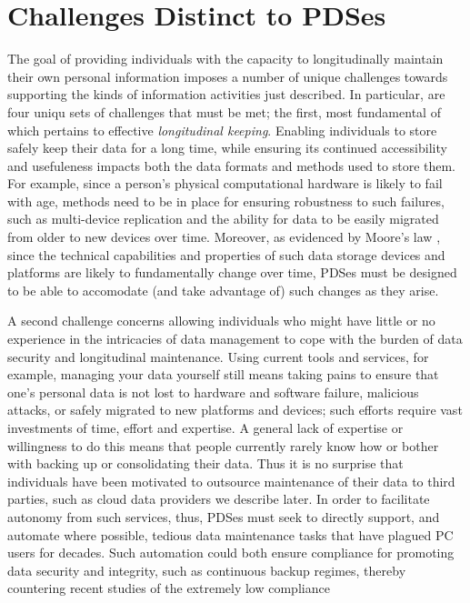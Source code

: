 \documentclass[runningheads,a4paper]{llncs}
\begin{document}
\section{Challenges Distinct to PDSes}

The goal of providing individuals with the capacity to longitudinally maintain their own personal information imposes a number of unique challenges towards supporting the kinds of information activities just described.  In particular, are four uniqu sets of challenges that must be met; the first, most fundamental of which pertains to effective \emph{longitudinal keeping}.  Enabling individuals to store safely keep their data for a long time, while ensuring its continued accessibility and usefuleness impacts both the data formats and methods used to store them.  For example, since a person's physical computational hardware is likely to fail with age, methods need to be in place for ensuring robustness to such failures, such as multi-device replication and the ability for data to be easily migrated from older to new devices over time.   Moreover, as evidenced by Moore's law \cite{gray2000rules}, since the technical capabilities and properties of such data storage devices and platforms are likely to fundamentally change over time, PDSes must be designed to be able to accomodate (and take advantage of) such changes as they arise.

A second challenge concerns allowing individuals who might have little or no experience in the intricacies of data management to cope with the burden of data security and longitudinal maintenance.  Using current tools and services, for example, managing your data yourself still means taking pains to ensure that one's personal data is not lost to hardware and software failure, malicious attacks, or safely migrated to new platforms and devices; such efforts require vast investments of time, effort and expertise.  A general lack of expertise or willingness to do this  means that people currently rarely know how or bother with backing up or consolidating their data. Thus it is no surprise that individuals have been motivated to outsource maintenance of their data to third parties, such as cloud data providers we describe later.  In order to facilitate autonomy from such services, thus, PDSes must seek to directly support, and automate where possible, tedious data maintenance tasks that have plagued PC users for decades.  Such automation could both ensure compliance for promoting data security and integrity, such as continuous backup regimes, thereby countering recent studies of the extremely low compliance 
\end{document}
